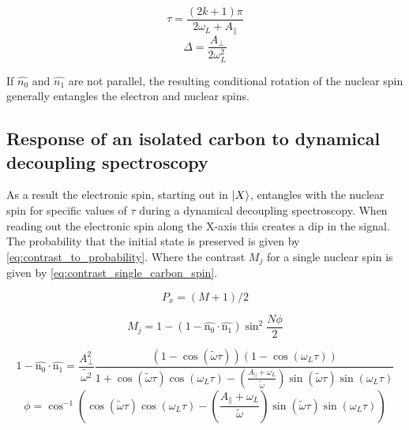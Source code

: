  \begin{equation}
\tau = \frac{(2k+1)\pi}{2 \omega_L + A_\parallel}
\label{eq:res_dip_loc}
\end{equation}
 \begin{equation}
\Delta = \frac{A_\perp}{2 \omega_L^2}
\label{eq:res_dip_width}
\end{equation}

If  $\hat{n_0}$ and $\hat{n_1}$ are not parallel, the resulting conditional rotation of the nuclear spin generally entangles the electron and nuclear spins.

\subsection{Response of an isolated carbon to dynamical decoupling spectroscopy}

As a result the electronic spin, starting out in ${\left\vert{X}\right\rangle}$, entangles with the nuclear spin for specific values of $\tau$ during a dynamical decoupling spectroscopy.
When reading out the electronic spin along the X-axis this creates a dip in the signal.
The probability that the initial state is preserved is given by \cref{eq:contrast_to_probability}. Where the contrast $M_j$ for a single nuclear spin is given by \cref{eq:contrast_single_carbon_spin}\citep{Taminiau2012Detection}.

\begin{equation}
\label{eq:contrast_to_probability}
P_x = (M+1)/2
\end{equation}

\begin{equation}
\label{eq:contrast_single_carbon_spin}
M_j = 1-(1 - \hat{\bm{\mathrm{n_0}}} \cdot \hat{\bm{\mathrm{n_1}}}) \sin^2 \frac{N\phi}{2}
\end{equation}

\begin{equation}
\label{eq:vec_term}
    1 - \hat{\bm{\mathrm{n_0}}} \cdot \hat{\bm{\mathrm{n_1}}} =  \frac{A_\perp ^2}{\tilde{\omega^2}} \frac{(1- \cos{(\tilde{\omega} \tau)})(1-\cos{(\omega_L \tau)})} {1 +\cos{(\tilde{\omega} \tau)}\cos{(\omega_L \tau)} - (\frac{ A_ \parallel + \omega_L }{ \tilde{ \omega}}) \sin{(\tilde{\omega} \tau)}\sin{(\omega_L \tau)}}
\end{equation}
\begin{equation}
\label{eq:angle_term}
    \phi =  \cos^{-1}\left(\cos(\tilde{\omega} \tau) \cos(\omega_L \tau)-\left(\frac{ A_ \parallel + \omega_L }{ \tilde{ \omega}}\right) \sin(\tilde{\omega} \tau)\sin(\omega_L \tau)\right)
\end{equation}

